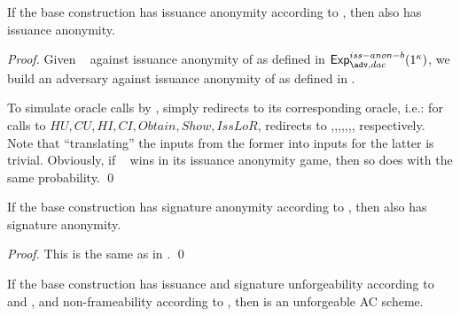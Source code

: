 \begin{theorem}
  If the base \CUASGen construction has issuance anonymity according to
  , then \CUASDAC also has issuance anonymity.
\end{theorem}

\begin{proof}
  Given \adv~ against issuance anonymity of \CUASDAC as defined in
  $\Exp^{iss-anon-b}_{\adv,dac}(1^\secpar)$, we build an adversary \advB against
  issuance anonymity of \CUASGen as defined in .

  To simulate oracle calls by \adv, \advB simply redirects to its corresponding
  oracle, i.e.: for calls to $HU,CU,HI,CI,Obtain,Show,IssLoR$, \advB redirects
  to \HUGEN,\CUGEN,\IGEN,\ICORR,\OBTAIN,\SIGN,\OBTCHALb, respectively. Note that
  ``translating'' the inputs from the former into inputs for the latter is
  trivial. Obviously, if \adv~ wins in its issuance anonymity game, then so does
  \advB with the  same probability.
  \qed
\end{proof}

\begin{theorem}
  If the base \CUASGen construction has signature anonymity according to
  , then \CUASDAC also has signature anonymity.
\end{theorem}

\begin{proof}
  This is the same as in .
  \qed
\end{proof}

\begin{theorem}
  If the base \CUASGen construction has issuance and signature unforgeability
  according to  and , and
  non-frameability according to , then \CUASAC is an
  unforgeable AC scheme.
\end{theorem}

